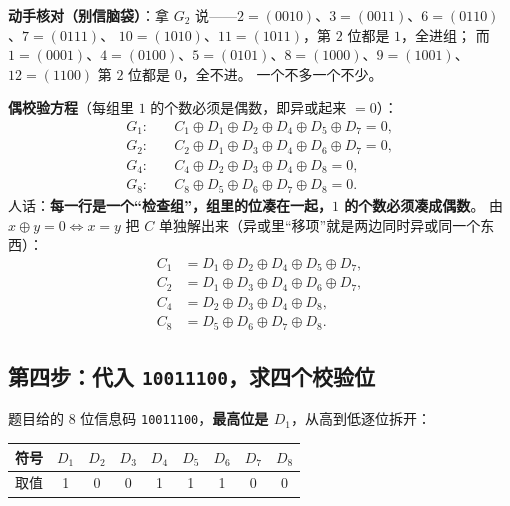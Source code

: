 \documentclass[11pt,a4paper]{ctexart}
\begin{document}
\textbf{动手核对（别信脑袋）}：拿 $G_2$ 说——$2=(0010)$、$3=(0011)$、$6=(0110)$、$7=(0111)$、
$10=(1010)$、$11=(1011)$，第 $2$ 位都是 $1$，全进组；
而 $1=(0001)$、$4=(0100)$、$5=(0101)$、$8=(1000)$、$9=(1001)$、$12=(1100)$ 第 $2$ 位都是 $0$，全不进。
一个不多一个不少。

\textbf{偶校验方程}（每组里 $1$ 的个数必须是偶数，即异或起来 $=0$）：
\begin{align*}
G_1:\quad & C_1\oplus D_1\oplus D_2\oplus D_4\oplus D_5\oplus D_7=0,\\
G_2:\quad & C_2\oplus D_1\oplus D_3\oplus D_4\oplus D_6\oplus D_7=0,\\
G_4:\quad & C_4\oplus D_2\oplus D_3\oplus D_4\oplus D_8=0,\\
G_8:\quad & C_8\oplus D_5\oplus D_6\oplus D_7\oplus D_8=0 .
\end{align*}
人话：\textbf{每一行是一个“检查组”，组里的位凑在一起，$1$ 的个数必须凑成偶数}。
由 $x\oplus y=0\iff x=y$ 把 $C$ 单独解出来（异或里“移项”就是两边同时异或同一个东西）：
\begin{align*}
C_1&=D_1\oplus D_2\oplus D_4\oplus D_5\oplus D_7,\\
C_2&=D_1\oplus D_3\oplus D_4\oplus D_6\oplus D_7,\\
C_4&=D_2\oplus D_3\oplus D_4\oplus D_8,\\
C_8&=D_5\oplus D_6\oplus D_7\oplus D_8 .
\end{align*}

\subsection{第四步：代入 \texttt{10011100}，求四个校验位}

题目给的 $8$ 位信息码 \texttt{10011100}，\textbf{最高位是 $D_1$}，从高到低逐位拆开：

\begin{center}\small
\setlength{\tabcolsep}{6pt}
\begin{tabular}{@{}lcccccccc@{}}
\toprule
符号 & $D_1$ & $D_2$ & $D_3$ & $D_4$ & $D_5$ & $D_6$ & $D_7$ & $D_8$\\
\midrule
取值 & 1 & 0 & 0 & 1 & 1 & 1 & 0 & 0\\
\bottomrule
\end{tabular}
\end{center}
\end{document}
